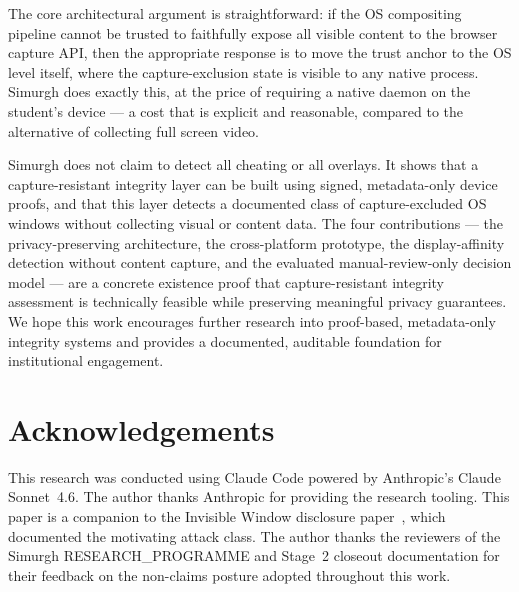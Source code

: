 \documentclass[conference]{IEEEtran}
\begin{document}
The core architectural argument is straightforward: if the OS compositing pipeline cannot be trusted to faithfully expose all visible content to the browser capture API, then the appropriate response is to move the trust anchor to the OS level itself, where the capture-exclusion state is visible to any native process. Simurgh does exactly this, at the price of requiring a native daemon on the student's device — a cost that is explicit and reasonable, compared to the alternative of collecting full screen video.

Simurgh does not claim to detect all cheating or all overlays. It shows that a capture-resistant integrity layer can be built using signed, metadata-only device proofs, and that this layer detects a documented class of capture-excluded OS windows without collecting visual or content data. The four contributions — the privacy-preserving architecture, the cross-platform prototype, the display-affinity detection without content capture, and the evaluated manual-review-only decision model — are a concrete existence proof that capture-resistant integrity assessment is technically feasible while preserving meaningful privacy guarantees. We hope this work encourages further research into proof-based, metadata-only integrity systems and provides a documented, auditable foundation for institutional engagement.

\section*{Acknowledgements}

This research was conducted using Claude Code powered by Anthropic's Claude Sonnet~4.6. The author thanks Anthropic for providing the research tooling. This paper is a companion to the Invisible Window disclosure paper~\cite{abedini2026invisible}, which documented the motivating attack class. The author thanks the reviewers of the Simurgh RESEARCH\_PROGRAMME and Stage~2 closeout documentation for their feedback on the non-claims posture adopted throughout this work.

{\sloppy


}
\end{document}

